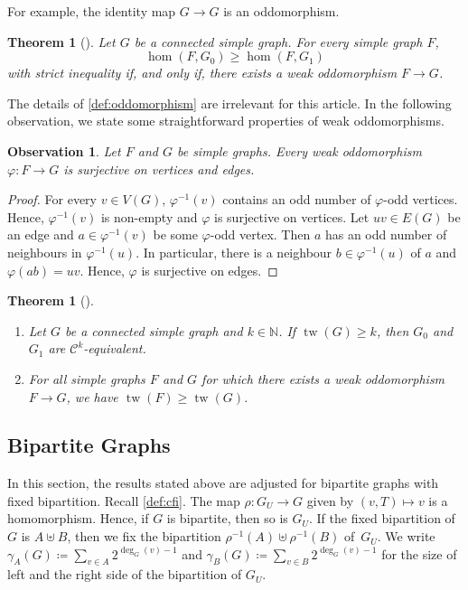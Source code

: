 \documentclass[10pt,a4paper]{article}
\theoremstyle{definition}
\theoremstyle{plain}
\newtheorem{theorem}[definition]{Theorem}
\newtheorem{observation}[definition]{Observation}
\theoremstyle{remark}
\DeclareMathOperator{\tw}{tw}
\renewcommand{\phi}{\varphi}
\begin{document}
	For example, the identity map $G \to G$ is an oddomorphism.
	
	\begin{theorem}[{\cite[Theorem~3.13]{roberson_oddomorphisms_2022}}]\label{thm:rob3.13}
		Let $G$ be a connected simple graph.
		For every simple graph $F$,
		\[
			\hom(F, G_0) \geq \hom(F, G_1)
		\]
		with strict inequality if, and only if, there exists a weak oddomorphism $F \to G$.
	\end{theorem}

	The details of \cref{def:oddomorphism} are irrelevant for this article.
	In the following observation, we state some straightforward properties of weak oddomorphisms.
	\begin{observation} \label{obs:oddo-surjective}
		Let $F$ and $G$ be simple graphs. Every weak oddomorphism $\phi \colon F\to G$ is surjective on vertices and edges.
	\end{observation}
	\begin{proof}
		For every $v \in V(G)$, $\phi^{-1}(v)$ contains an odd number of $\phi$-odd vertices. Hence, $\phi^{-1}(v)$ is non-empty and $\phi$ is surjective on vertices.
		Let $uv \in E(G)$ be an edge and $a \in \phi^{-1}(v)$ be some $\phi$-odd vertex. 
		Then $a$ has an odd number of neighbours in $\phi^{-1}(u)$.
		In particular, there is a neighbour $b \in
                \phi^{-1}(u)$ of $a$ and $\phi(ab) = uv$.
		Hence, $\phi$ is surjective on edges.
	\end{proof}
	
	\begin{theorem}[{\cite[Lemma~12, Corollary~13]{neuen_homomorphism-distinguishing_2024}}]\label{thm:neuen}
		\begin{enumerate}
			\item Let $G$ be a connected simple graph and $k \in \mathbb{N}$.
			If $\tw(G) \geq k$, then $G_0$ and $G_1$ are $\mathcal{C}^k$-equivalent.
			\item For all simple graphs $F$ and $G$ for
                          which there exists a weak oddomorphism $F
                          \to G$, we have $\tw(F) \geq \tw(G)$.
		\end{enumerate}
	\end{theorem}

	\subsection{Bipartite  Graphs}
	
	In this section, the results stated above are adjusted for bipartite graphs with fixed bipartition.
	Recall \cref{def:cfi}.
	The map $\rho \colon G_U \to G$ given by $(v, T) \mapsto v$ is a homomorphism.
	Hence, if $G$ is bipartite,
	then so is $G_U$.
	If the fixed bipartition of $G$ is $A \uplus B$,
	then we fix the bipartition $\rho^{-1}(A) \uplus \rho^{-1}(B)$ of~$G_U$.
	We write $\gamma_A(G) \coloneqq \sum_{v\in A}2^{\deg_G(v) -1}$ and $\gamma_B(G) \coloneqq \sum_{v\in B}2^{\deg_G(v) -1}$ for the size of left and the right side of the bipartition of $G_U$.
	
\end{document}
